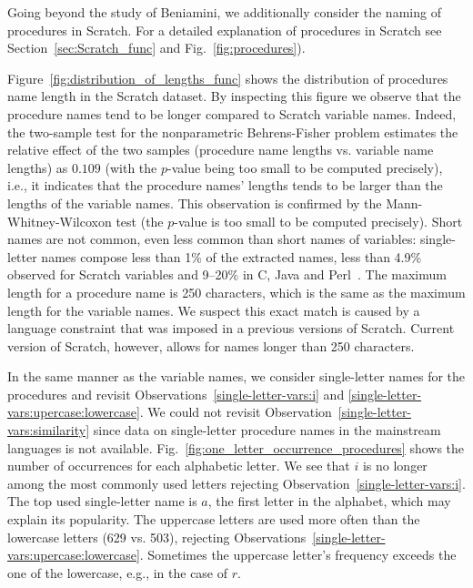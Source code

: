 \documentclass[conference]{IEEEtran}
\begin{document}
Going beyond the study of Beniamini, we additionally consider the naming of procedures in Scratch. 
For a detailed explanation of procedures in Scratch see Section~\ref{sec:Scratch_func} and Fig.~\ref{fig:procedures}).  

Figure~\ref{fig:distribution_of_lengths_func} shows the distribution of procedures name length in the Scratch dataset. 
By inspecting this figure we observe that the procedure names tend to be longer compared to Scratch variable names. 
Indeed, the two-sample test for the nonparametric Behrens-Fisher problem estimates the relative effect of the two samples (procedure name lengths vs. variable name lengths) as $0.109$ (with the $p$-value being too small to be computed precisely), i.e., it indicates that the procedure names' lengths tends to be larger than the lengths of the variable names. 
This observation is confirmed by the Mann-Whitney-Wilcoxon test (the $p$-value is too small to be computed precisely).
Short names are not common, even less common than short names of variables: single-letter names compose less than 1\% of the extracted names, less than 4.9\% observed for Scratch variables and 9--20\% in C, Java and Perl~\cite{Beniamini}. 
The maximum length for a procedure name is 250 characters, which is the same as the maximum length for the variable names. 
We suspect this exact match is caused by a language constraint that was imposed in a previous versions of Scratch. 
Current version of Scratch, however, allows for names longer than 250 characters. 

In the same manner as the variable names, we consider single-letter names for the procedures and revisit Observations~\ref{single-letter-vars:i} and \ref{single-letter-vars:upercase:lowercase}. 
We could not revisit Observation~\ref{single-letter-vars:similarity} since data on single-letter procedure names in the mainstream languages is not available.
Fig.~\ref{fig:one_letter_occurrence_procedures} shows the number of occurrences for each alphabetic letter. 
We see that $i$ is no longer among the most commonly used letters rejecting Observation~\ref{single-letter-vars:i}.
The top used single-letter name is $a$, the first letter in the alphabet, which may explain its popularity.
The uppercase letters are used more often than the lowercase letters (629 vs. 503), rejecting Observations~\ref{single-letter-vars:upercase:lowercase}.
Sometimes the uppercase letter's frequency exceeds the one of the lowercase, e.g., in the case of $r$. 
\end{document}
